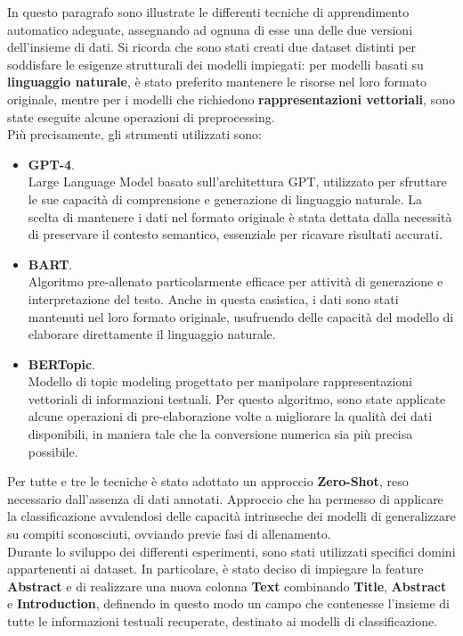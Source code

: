 In questo paragrafo sono illustrate le differenti tecniche di apprendimento automatico adeguate, assegnando ad ognuna di esse una delle due versioni dell'insieme di dati. Si ricorda che sono stati creati due dataset distinti per soddisfare le esigenze strutturali dei modelli impiegati: per modelli basati su \textbf{linguaggio naturale}, è stato preferito mantenere le risorse nel loro formato originale, mentre per i modelli che richiedono \textbf{rappresentazioni vettoriali}, sono state eseguite alcune operazioni di preprocessing. \vspace{7pt}\\
Più precisamente, gli strumenti utilizzati sono:
\begin{itemize}
    \renewcommand{\labelitemi}{-}
    \item \textbf{GPT-4}. \\
    Large Language Model basato sull'architettura GPT, utilizzato per sfruttare le sue capacità di comprensione e generazione di linguaggio naturale. La scelta di mantenere i dati nel formato originale è stata dettata dalla necessità di preservare il contesto semantico, essenziale per ricavare risultati accurati.
    \item \textbf{BART}. \\
    Algoritmo pre-allenato particolarmente efficace per attività di generazione e interpretazione del testo. Anche in questa casistica, i dati sono stati mantenuti nel loro formato originale, usufruendo delle capacità del modello di elaborare direttamente il linguaggio naturale.
    \item \textbf{BERTopic}. \\
    Modello di topic modeling progettato per manipolare rappresentazioni vettoriali di informazioni testuali. Per questo algoritmo, sono state applicate alcune operazioni di pre-elaborazione volte a migliorare la qualità dei dati disponibili, in maniera tale che la conversione numerica sia più precisa possibile.
\end{itemize}
Per tutte e tre le tecniche è stato adottato un approccio \textbf{Zero-Shot}, reso necessario dall'assenza di dati annotati. Approccio che ha permesso di applicare la classificazione avvalendosi delle capacità intrinseche dei modelli di generalizzare su compiti sconosciuti, ovviando previe fasi di allenamento. \vspace{7pt}\\
Durante lo sviluppo dei differenti esperimenti, sono stati utilizzati specifici domini appartenenti ai dataset. In particolare, è stato deciso di impiegare la feature \textbf{Abstract} e di realizzare una nuova colonna \textbf{Text} combinando \textbf{Title}, \textbf{Abstract} e \textbf{Introduction}, definendo in questo modo un campo che contenesse l'insieme di tutte le informazioni testuali recuperate, destinato ai modelli di classificazione. 